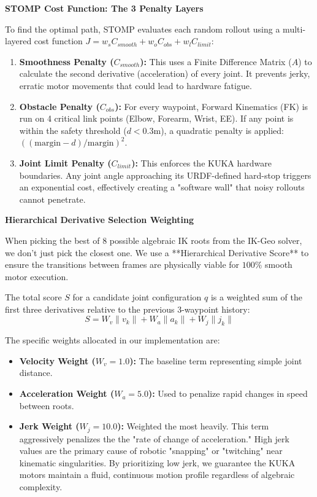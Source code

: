 \documentclass[11pt, a4paper]{article}
\begin{document}
\vspace{0.4cm}

{\Large\textbf{STOMP Cost Function: The 3 Penalty Layers}}

To find the optimal path, STOMP evaluates each random rollout using a multi-layered cost function $J = w_s C_{smooth} + w_o C_{obs} + w_l C_{limit}$:

\begin{enumerate}
    \item \textbf{Smoothness Penalty ($C_{smooth}$):} This uses a Finite Difference Matrix ($A$) to calculate the second derivative (acceleration) of every joint. It prevents jerky, erratic motor movements that could lead to hardware fatigue.
    \item \textbf{Obstacle Penalty ($C_{obs}$):} For every waypoint, Forward Kinematics (FK) is run on 4 critical link points (Elbow, Forearm, Wrist, EE). If any point is within the safety threshold ($d < 0.3 \text{m}$), a quadratic penalty is applied: $((\text{margin} - d)/\text{margin})^2$.
    \item \textbf{Joint Limit Penalty ($C_{limit}$):} This enforces the KUKA hardware boundaries. Any joint angle approaching its URDF-defined hard-stop triggers an exponential cost, effectively creating a "software wall" that noisy rollouts cannot penetrate.
\end{enumerate}

\vspace{0.4cm}

{\Large\textbf{Hierarchical Derivative Selection Weighting}}

When picking the best of 8 possible algebraic IK roots from the IK-Geo solver, we don't just pick the closest one. We use a **Hierarchical Derivative Score** to ensure the transitions between frames are physically viable for $100\%$ smooth motor execution.

The total score $S$ for a candidate joint configuration $q$ is a weighted sum of the first three derivatives relative to the previous 3-waypoint history:
\begin{equation*}
    S = W_v \|v_k\| + W_a \|a_k\| + W_j \|j_k\|
\end{equation*}

The specific weights allocated in our implementation are:
\begin{itemize}
    \item \textbf{Velocity Weight ($W_v = 1.0$):} The baseline term representing simple joint distance.
    \item \textbf{Acceleration Weight ($W_a = 5.0$):} Used to penalize rapid changes in speed between roots.
    \item \textbf{Jerk Weight ($W_j = 10.0$):} Weighted the most heavily. This term aggressively penalizes the the "rate of change of acceleration." High jerk values are the primary cause of robotic "snapping" or "twitching" near kinematic singularities. By prioritizing low jerk, we guarantee the KUKA motors maintain a fluid, continuous motion profile regardless of algebraic complexity.
\end{itemize}
\end{document}
